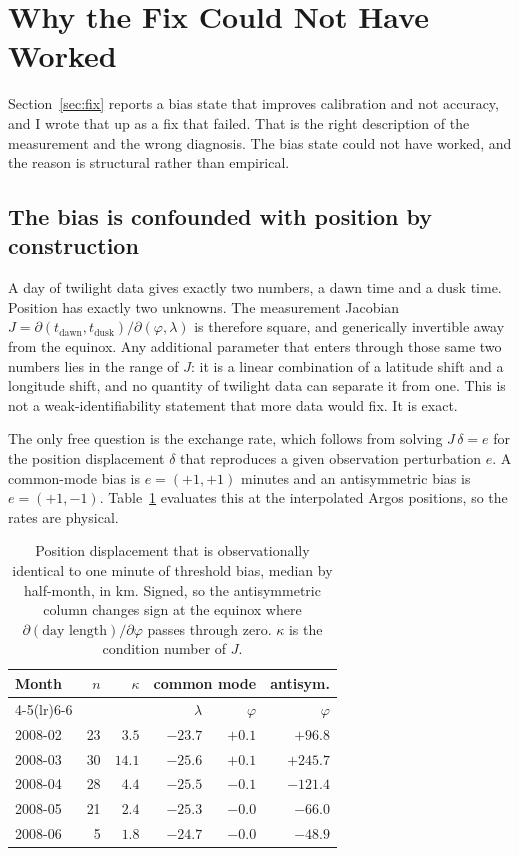 \documentclass[conference]{IEEEtran}
\begin{document}
\section{Why the Fix Could Not Have Worked}
\label{sec:ident}

Section~\ref{sec:fix} reports a bias state that improves calibration and not
accuracy, and I wrote that up as a fix that failed. That is the right description
of the measurement and the wrong diagnosis. The bias state could not have worked,
and the reason is structural rather than empirical.

\subsection{The bias is confounded with position by construction}
A day of twilight data gives exactly two numbers, a dawn time and a dusk time.
Position has exactly two unknowns. The measurement Jacobian
$J = \partial(t_\text{dawn}, t_\text{dusk}) / \partial(\varphi, \lambda)$ is
therefore square, and generically invertible away from the equinox. Any additional
parameter that enters through those same two numbers lies in the range of $J$: it
is a linear combination of a latitude shift and a longitude shift, and no quantity
of twilight data can separate it from one. This is not a weak-identifiability
statement that more data would fix. It is exact.

The only free question is the exchange rate, which follows from solving
$J\,\delta = e$ for the position displacement $\delta$ that reproduces a given
observation perturbation $e$. A common-mode bias is $e = (+1, +1)$ minutes and an
antisymmetric bias is $e = (+1, -1)$. Table~\ref{tab:ident} evaluates this at the
interpolated Argos positions, so the rates are physical.

\begin{table}[t]
\caption{Position displacement that is observationally identical to one minute of
threshold bias, median by half-month, in \si{\km}. Signed, so the antisymmetric
column changes sign at the equinox where $\partial(\text{day length})/\partial
\varphi$ passes through zero. $\kappa$ is the condition number of $J$.}
\label{tab:ident}
\centering
\begin{tabular}{lrrrrr}
\toprule
Month & $n$ & $\kappa$ & \multicolumn{2}{c}{common mode} & antisym. \\
\cmidrule(lr){4-5}\cmidrule(lr){6-6}
 &  &  & $\lambda$ & $\varphi$ & $\varphi$ \\
\midrule
2008-02 & 23 & $3.5$  & $-23.7$ & $+0.1$ & $+96.8$  \\
2008-03 & 30 & $14.1$ & $-25.6$ & $+0.1$ & $+245.7$ \\
2008-04 & 28 & $4.4$  & $-25.5$ & $-0.1$ & $-121.4$ \\
2008-05 & 21 & $2.4$  & $-25.3$ & $-0.0$ & $-66.0$  \\
2008-06 &  5 & $1.8$  & $-24.7$ & $-0.0$ & $-48.9$  \\
\bottomrule
\end{tabular}
\end{table}
\end{document}
